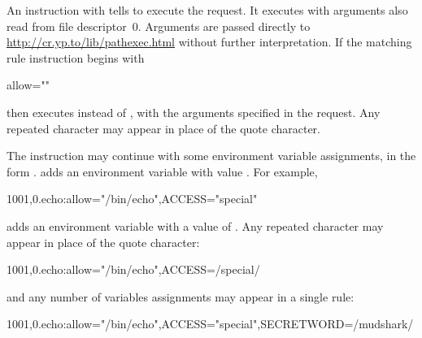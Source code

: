 \documentclass{book}
\begin{document}
An instruction with  tells  to execute the request.  It
executes  with arguments also read from file descriptor~0.  Arguments
are passed directly to \href{\cmd{pathexec}}{http://cr.yp.to/lib/pathexec.html}
without further interpretation.  If the matching rule instruction begins with
\begin{code}%
  allow=""
\end{code}
then  executes  instead of , with the
arguments specified in the request.  Any repeated character may appear in place
of the quote character.

The instruction may continue with some environment variable assignments, in the
form .   adds an environment variable  with
value .  For example,
\begin{code}%
  1001,0.echo:allow="/bin/echo",ACCESS="special"
\end{code}
adds an environment variable  with a value of
.  Any repeated character may appear in place of the
quote character:
\begin{code}%
  1001,0.echo:allow="/bin/echo",ACCESS=/special/
\end{code}
and any number of variables assignments may appear in a single rule:
\begin{code}%
  1001,0.echo:allow="/bin/echo",ACCESS="special",SECRETWORD=/mudshark/
\end{code}
\end{document}
